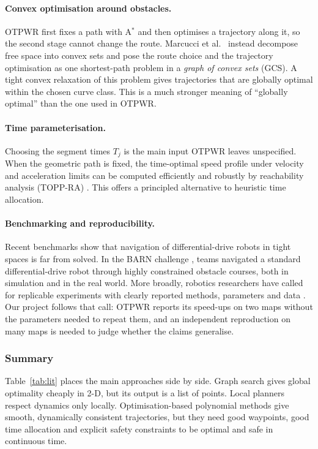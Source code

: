 \documentclass[11pt,a4paper]{article}
\begin{document}
\paragraph{Convex optimisation around obstacles.} OTPWR first fixes a path
with A$^\ast$ and then optimises a trajectory along it, so the second stage
cannot change the route. Marcucci et al.\ \citep{marcucci2023gcs} instead
decompose free space into convex sets and pose the route choice and the
trajectory optimisation as one shortest-path problem in a \emph{graph of
convex sets} (GCS). A tight convex relaxation of this problem gives
trajectories that are globally optimal within the chosen curve class. This
is a much stronger meaning of ``globally optimal'' than the one used in
OTPWR.

\paragraph{Time parameterisation.} Choosing the segment times $T_j$ is the
main input OTPWR leaves unspecified. When the geometric path is fixed, the
time-optimal speed profile under velocity and acceleration limits can be
computed efficiently and robustly by reachability analysis (TOPP-RA)
\citep{pham2018toppra}. This offers a principled alternative to heuristic
time allocation.

\paragraph{Benchmarking and reproducibility.} Recent benchmarks show that
navigation of differential-drive robots in tight spaces is far from solved.
In the BARN challenge \citep{xiao2022barn}, teams navigated a standard
differential-drive robot through highly constrained obstacle courses, both
in simulation and in the real world. More broadly, robotics researchers have
called for replicable experiments with clearly reported methods, parameters
and data \citep{bonsignorio2015replicable}. Our project follows that call:
OTPWR reports its speed-ups on two maps without the parameters needed to
repeat them, and an independent reproduction on many maps is needed to
judge whether the claims generalise.

\subsubsection{Summary}
\label{sec:lit-gap}

Table~\ref{tab:lit} places the main approaches side by side. Graph search
gives global optimality cheaply in 2-D, but its output is a list of points.
Local planners respect dynamics only locally. Optimisation-based polynomial
methods give smooth, dynamically consistent trajectories, but they need good
waypoints, good time allocation and explicit safety constraints to be
optimal and safe in continuous time.
\end{document}
